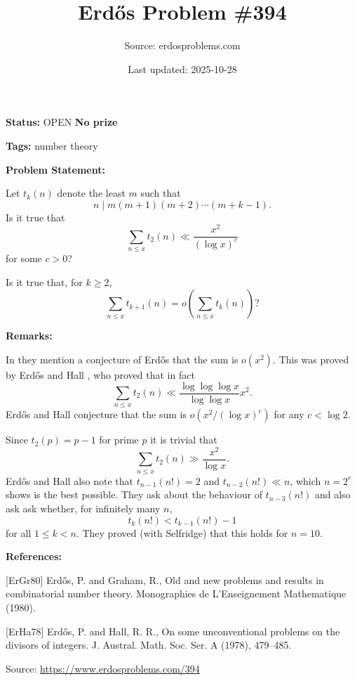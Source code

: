 \documentclass{article}
\title{Erd\H{o}s Problem \#394}
\date{Last updated: 2025-10-28}
\author{Source: erdosproblems.com}
\begin{document}
\maketitle

\noindent\textbf{Status:} OPEN \quad \textbf{No prize}

\noindent\textbf{Tags:} number theory

\medskip
\noindent\textbf{Problem Statement:}

Let $t_k(n)$ denote the least $m$ such that\[n\mid m(m+1)(m+2)\cdots (m+k-1).\]Is it true that\[\sum_{n\leq x}t_2(n)\ll \frac{x^2}{(\log x)^c}\]for some $c>0$?

Is it true that, for $k\geq 2$,\[\sum_{n\leq x}t_{k+1}(n) =o\left(\sum_{n\leq x}t_k(n)\right)?\]

\bigskip
\noindent\textbf{Remarks:}

In \cite{ErGr80} they mention a conjecture of Erd\H{o}s that the sum is $o(x^2)$. This was proved by Erd\H{o}s and Hall \cite{ErHa78}, who proved that in fact\[\sum_{n\leq x}t_2(n)\ll \frac{\log\log\log x}{\log\log x}x^2.\]Erd\H{o}s and Hall conjecture that the sum is $o(x^2/(\log x)^c)$ for any $c<\log 2$.

Since $t_2(p)=p-1$ for prime $p$ it is trivial that\[\sum_{n\leq x}t_2(n)\gg \frac{x^2}{\log x}.\]Erd\H{o}s and Hall \cite{ErHa78} also note that $t_{n-1}(n!)=2$ and $t_{n-2}(n!)\ll n$, which $n=2^r$ shows is the best possible. They ask about the behaviour of $t_{n-3}(n!)$ and also ask ask whether, for infinitely many $n$,\[t_k(n!)< t_{k-1}(n!)-1\]for all $1\leq k<n$. They proved (with Selfridge) that this holds for $n=10$.

\bigskip
\noindent\textbf{References:}

[ErGr80] Erd\H{o}s, P. and Graham, R., Old and new problems and results in combinatorial number theory. Monographies de L'Enseignement Mathematique (1980).
 
 [ErHa78] Erd\H{o}s, P. and Hall, R. R., On some unconventional problems on the divisors of integers. J. Austral. Math. Soc. Ser. A (1978), 479--485.

\bigskip
\noindent\small{Source: \url{https://www.erdosproblems.com/394}}
\end{document}
